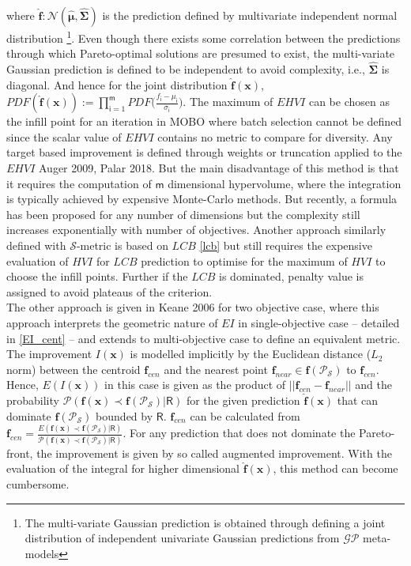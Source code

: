 where $\bm{\hat{f}}:\mathcal{N}(\bm{\hat \mu}, \bm{\hat \Sigma})$ is the prediction defined by multivariate independent normal distribution \footnote{The multi-variate Gaussian prediction is obtained through defining a joint distribution of independent univariate Gaussian predictions from $\mathcal{GP}$ meta-models}. 
Even though there exists some correlation between the predictions through which Pareto-optimal solutions are presumed to exist, the multi-variate Gaussian prediction is defined to be independent to avoid complexity, i.e.,  $\bm{\hat{\Sigma}}$ is diagonal. And hence for the joint distribution $\bm{\hat{f}}({\bm x})$, $PDF(\bm{\hat{f}}({\bm x})) := \prod^{\mathsf m}_{\mathsf{i}=1} PDF\big( \frac{f_{\mathsf{i}}-\mu_{\mathsf{i}} }{\sigma_{\mathsf{i}}} \big)$. The maximum of $EHVI$ can be chosen as the infill point for an iteration in MOBO where batch selection cannot be defined since the scalar value of $EHVI$ contains no metric to compare for diversity. Any target based improvement is defined through weights or truncation applied to the $EHVI$ {\color{red} Auger 2009, Palar 2018}. But the main disadvantage of this method is that it requires the computation of $\mathsf{m}$ dimensional hypervolume, where the integration is typically achieved by expensive Monte-Carlo methods. But recently, a formula has been proposed for any number of dimensions but the complexity still increases exponentially with number of objectives. Another approach similarly defined with $\mathcal{S}$-metric is based on $LCB$ \eqref{lcb} but still requires the expensive evaluation of $HVI$ for $LCB$ prediction to optimise for the maximum of $HVI$ to choose the infill points. Further if the $LCB$ is dominated, penalty value is assigned to avoid plateaus of the criterion.\\

The other approach is given in {\color{red} Keane 2006} for two objective case, where this approach interprets the geometric nature of $EI$ in single-objective case  -- detailed in \eqref{EI_cent} -- and extends to multi-objective case to define an equivalent metric.
The improvement $I(\bm x)$ is modelled implicitly by the Euclidean distance ($L_2$ norm) between the centroid  $\bm{f}_{cen}$ and the nearest point $\bm{f}_{near} \in \bm f(\mathscr{P}_{\mathcal{S}})$ to $\bm{f}_{cen}$. 
Hence, $E(I(\bm x))$ in this case is given as the product of $||\bm{f}_{cen} - \bm{f}_{near}||$ and 
the probability $\mathcal{P}(\bm{{f}}(\bm x) \prec \bm f(\mathscr{P}_{\mathcal{S}})|\bm{\mathsf{R}})$ for the given prediction $\bm{\hat{f}}(\bm x)$ that can dominate $\bm f(\mathscr{P}_{\mathcal{S}})$ bounded by $\bm{\mathsf{R}}$.  $\bm{f}_{cen}$ can be calculated from $\bm{f}_{cen} = \frac{E(\bm{{f}}(\bm x) \prec \bm f(\mathscr{P}_{\mathcal{S}})|\bm{\mathsf{R}})}{\mathcal{P}(\bm{{f}}(\bm x) \prec \bm f(\mathscr{P}_{\mathcal{S}})| \bm{\mathsf{R}})}$. For any prediction that does not dominate the Pareto-front, the improvement is given by so called augmented improvement. With the evaluation of the integral for higher dimensional $\bm{\hat{f}}(\bm x)$, this method can become cumbersome.\\

